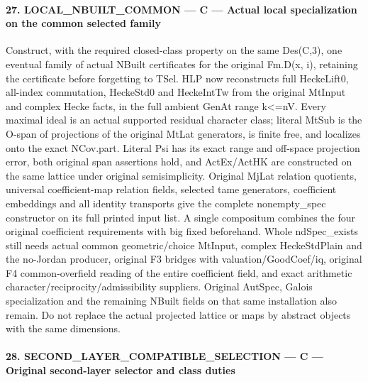 \paragraph{27. LOCAL\_\allowbreak{}NBUILT\_\allowbreak{}COMMON — C — Actual local specialization on the common selected family}

Construct, with the required closed-class property on the same Des(C,3), one eventual family of actual NBuilt certificates for the original Fm.D(x,\allowbreak{} i), retaining the certificate before forgetting to TSel. HLP now reconstructs full HeckeLift0, all-index commutation, HeckeStd0 and HeckeIntTw from the original MtInput and complex Hecke facts, in the full ambient GenAt range k<=nV. Every maximal ideal is an actual supported residual character class; literal MtSub is the O-span of projections of the original MtLat generators, is finite free, and localizes onto the exact NCov.part. Literal Psi has its exact range and off-space projection error, both original span assertions hold, and ActEx/\allowbreak{}ActHK are constructed on the same lattice under original semisimplicity. Original MjLat relation quotients, universal coefficient-map relation fields, selected tame generators, coefficient embeddings and all identity transports give the complete nonempty\_\allowbreak{}spec constructor on its full printed input list. A single compositum combines the four original coefficient requirements with big fixed beforehand. Whole ndSpec\_\allowbreak{}exists still needs actual common geometric/\allowbreak{}choice MtInput, complex HeckeStdPlain and the no-Jordan producer, original F3 bridges with valuation/\allowbreak{}GoodCoef/\allowbreak{}iq, original F4 common-overfield reading of the entire coefficient field, and exact arithmetic character/\allowbreak{}reciprocity/\allowbreak{}admissibility suppliers. Original AutSpec, Galois specialization and the remaining NBuilt fields on that same installation also remain. Do not replace the actual projected lattice or maps by abstract objects with the same dimensions.


\paragraph{28. SECOND\_\allowbreak{}LAYER\_\allowbreak{}COMPATIBLE\_\allowbreak{}SELECTION — C — Original second-layer selector and class duties}


